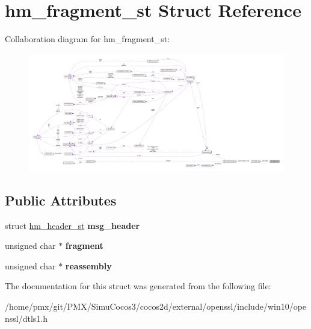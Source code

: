 \hypertarget{structhm__fragment__st}{}\section{hm\+\_\+fragment\+\_\+st Struct Reference}
\label{structhm__fragment__st}


Collaboration diagram for hm\+\_\+fragment\+\_\+st\+:
\nopagebreak
\begin{figure}[H]
\begin{center}
\leavevmode
\includegraphics[width=350pt]{structhm__fragment__st__coll__graph}
\end{center}
\end{figure}
\subsection*{Public Attributes}
\begin{DoxyCompactItemize}
\item 
\mbox{\label{structhm__fragment__st_a171c5cb6c7c15bdf7c6401d022247729}} 
struct \hyperlink{structhm__header__st}{hm\+\_\+header\+\_\+st} {\bfseries msg\+\_\+header}
\item 
\mbox{\label{structhm__fragment__st_ab36bd817673b28cc64b927b62faf7225}} 
unsigned char $\ast$ {\bfseries fragment}
\item 
\mbox{\label{structhm__fragment__st_a50a13bdc9997bc66cb7c578519413510}} 
unsigned char $\ast$ {\bfseries reassembly}
\end{DoxyCompactItemize}


The documentation for this struct was generated from the following file\+:\begin{DoxyCompactItemize}
\item 
/home/pmx/git/\+P\+M\+X/\+Simu\+Cocos3/cocos2d/external/openssl/include/win10/openssl/dtls1.\+h\end{DoxyCompactItemize}
